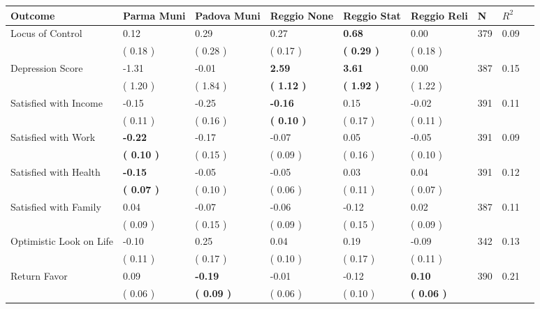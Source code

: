 \begin{tabular}{L{6.2cm} C{1.8cm} C{1.8cm} C{1.8cm} C{1.8cm} C{1.8cm} C{1.8cm} C{0.3cm} C{0.3cm}}
\toprule
 \textbf{Outcome} & \textbf{Parma Muni} & \textbf{Padova Muni} & \textbf{Reggio None} & \textbf{Reggio Stat} & \textbf{Reggio Reli} & \textbf{N} & \textbf{$ R^2$} \\
\midrule
Locus of Control &      0.12 &      0.29 &      0.27 & \textbf{     0.68} &      0.00  & 379 &       0.09 \\ 
 & (     0.18 ) & (     0.28 ) & (     0.17 ) & \textbf{(     0.29 )} & (     0.18 )  & \\
Depression Score &     -1.31 &     -0.01 & \textbf{     2.59} & \textbf{     3.61} &      0.00  & 387 &       0.15 \\ 
 & (     1.20 ) & (     1.84 ) & \textbf{(     1.12 )} & \textbf{(     1.92 )} & (     1.22 )  & \\
Satisfied with Income &     -0.15 &     -0.25 & \textbf{    -0.16} &      0.15 &     -0.02  & 391 &       0.11 \\ 
 & (     0.11 ) & (     0.16 ) & \textbf{(     0.10 )} & (     0.17 ) & (     0.11 )  & \\
Satisfied with Work & \textbf{    -0.22} &     -0.17 &     -0.07 &      0.05 &     -0.05  & 391 &       0.09 \\ 
 & \textbf{(     0.10 )} & (     0.15 ) & (     0.09 ) & (     0.16 ) & (     0.10 )  & \\
Satisfied with Health & \textbf{    -0.15} &     -0.05 &     -0.05 &      0.03 &      0.04  & 391 &       0.12 \\ 
 & \textbf{(     0.07 )} & (     0.10 ) & (     0.06 ) & (     0.11 ) & (     0.07 )  & \\
Satisfied with Family &      0.04 &     -0.07 &     -0.06 &     -0.12 &      0.02  & 387 &       0.11 \\ 
 & (     0.09 ) & (     0.15 ) & (     0.09 ) & (     0.15 ) & (     0.09 )  & \\
Optimistic Look on Life &     -0.10 &      0.25 &      0.04 &      0.19 &     -0.09  & 342 &       0.13 \\ 
 & (     0.11 ) & (     0.17 ) & (     0.10 ) & (     0.17 ) & (     0.11 )  & \\
Return Favor &      0.09 & \textbf{    -0.19} &     -0.01 &     -0.12 & \textbf{     0.10}  & 390 &       0.21 \\ 
 & (     0.06 ) & \textbf{(     0.09 )} & (     0.06 ) & (     0.10 ) & \textbf{(     0.06 )}  & \\

\end{tabular}
